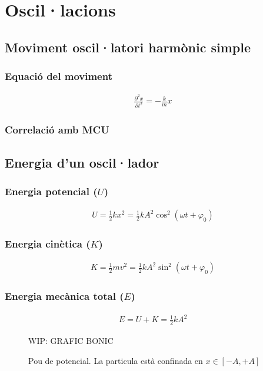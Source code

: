\section{Oscil·lacions}
\subsection{Moviment oscil·latori harmònic simple}

\subsubsection*{Equació del moviment}
\begin{align}
    \boxed{\frac{\partial^{2} x}{\partial t^{2}} = - \frac{k}{m} x}
\end{align}

\subsubsection*{Correlació amb MCU}
\subsection{Energia d'un oscil·lador}
\subsubsection*{Energia potencial ($U$)}
\begin{align}
    \boxed{U = \frac{1}{2} k x^{2} = \frac{1}{2} k A^{2} \cos^{2} (\omega t + \varphi_{0})}
\end{align}

\subsubsection*{Energia cinètica ($K$)}
\begin{align}
    \boxed{K = \frac{1}{2} m v^{2} = \frac{1}{2} k A^{2} \sin^{2} (\omega t + \varphi_{0})}
\end{align}

\subsubsection*{Energia mecànica total ($E$)}
\begin{align}
    \boxed{E = U + K = \frac{1}{2} k A^{2}}
\end{align}
\begin{figure}[H]
\centering
    WIP: GRAFIC BONIC 
\caption{Pou de potencial. La particula està confinada en $x \in [-A, +A]$}
\end{figure}

